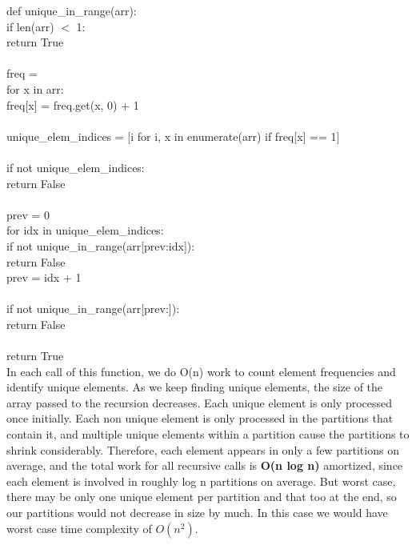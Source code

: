 \documentclass{article}[12pt]
\begin{document}
def unique\_in\_range(arr):\\
\hspace*{2em}if len(arr) $<$ 1:\\
\hspace*{3em}return True\\
\\
\hspace*{2em}freq = {}\\
\hspace*{2em}for x in arr:\\
\hspace*{3em}freq[x] = freq.get(x, 0) + 1\\
\\
\hspace*{2em}unique\_elem\_indices = [i for i, x in enumerate(arr) if freq[x] == 1]\\
\\
\hspace*{2em}if not unique\_elem\_indices:\\
\hspace*{3em}return False\\
\\
\hspace*{2em}prev = 0\\
\hspace*{2em}for idx in unique\_elem\_indices:\\
\hspace*{3em}if not unique\_in\_range(arr[prev:idx]):\\
\hspace*{4em}return False\\
\hspace*{3em}prev = idx + 1\\
\\
\hspace*{2em}if not unique\_in\_range(arr[prev:]):\\
\hspace*{3em}return False\\
\\
\hspace*{2em}return True \\

In each call of this function, we do O(n) work to count element frequencies and identify unique elements. As we keep finding unique elements, the size of the array passed to the recursion decreases. Each unique element is only processed once initially. Each non unique element is only processed in the partitions that contain it, and multiple unique elements within a partition cause the partitions to shrink considerably. Therefore, each element appears in only a few partitions on average, and the total work for all recursive calls is \textbf{O(n log n)} amortized, since each element is involved in roughly log n partitions on average. But worst case, there may be only one unique element per partition and that too at the end, so our partitions would not decrease in size by much. In this case we would have worst case time complexity of $O(n^2)$.
\end{document}
